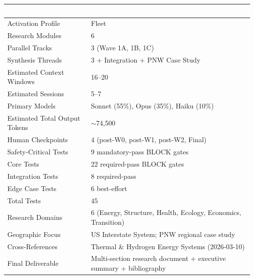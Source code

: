 \documentclass[11pt,letterpaper]{article}
\newcommand{\tableheader}[1]{\textbf{\sffamily\textcolor{white}{#1}}}
\begin{document}
\begin{center}
\begin{tabularx}{\textwidth}{L{5cm}X}
\toprule
{}
\tableheader{Metric} & \tableheader{Value} \\
\midrule
Activation Profile & Fleet \\
Research Modules & 6 \\
Parallel Tracks & 3 (Wave 1A, 1B, 1C) \\
Synthesis Threads & 3 + Integration + PNW Case Study \\
Estimated Context Windows & 16--20 \\
Estimated Sessions & 5--7 \\
Primary Models & Sonnet (55\%), Opus (35\%), Haiku (10\%) \\
Estimated Total Output Tokens & $\sim$74,500 \\
Human Checkpoints & 4 (post-W0, post-W1, post-W2, Final) \\
Safety-Critical Tests & 9 mandatory-pass BLOCK gates \\
Core Tests & 22 required-pass BLOCK gates \\
Integration Tests & 8 required-pass \\
Edge Case Tests & 6 best-effort \\
Total Tests & 45 \\
Research Domains & 6 (Energy, Structure, Health, Ecology, Economics, Transition) \\
Geographic Focus & US Interstate System; PNW regional case study \\
Cross-References & Thermal \& Hydrogen Energy Systems (2026-03-10) \\
Final Deliverable & Multi-section research document + executive summary + bibliography \\
\bottomrule
\end{tabularx}
\end{center}

\vspace{2em}
\end{document}
